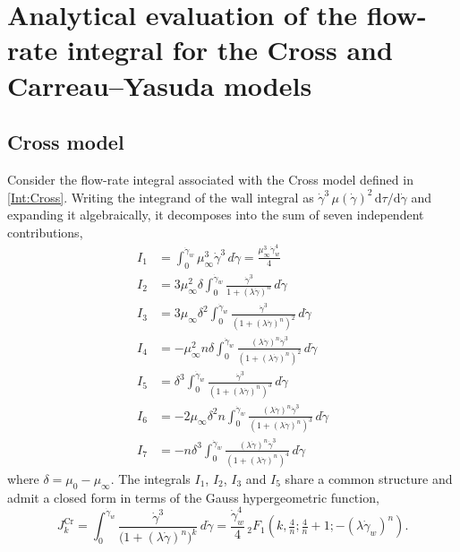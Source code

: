 \documentclass[lineno]{jfm}
\begin{document}





\appendix 
\section{Analytical evaluation of the flow-rate integral for the Cross and
Carreau--Yasuda models}\label{appA}

\subsection{Cross model}

Consider the flow-rate integral associated with the Cross model defined in
\eqref{Int:Cross}. Writing the integrand of the wall integral as
$\dot\gamma^{3}\,\mu(\dot\gamma)^{2}\,\mathrm d\tau/\mathrm d\dot\gamma$ and
expanding it algebraically, it decomposes into the sum of seven independent
contributions,
\begin{align}
I_1 &= \int_0^{\dot{\gamma}_w} \mu_{\infty}^3 \dot{\gamma}^3 \, d\dot{\gamma}
      = \frac{\mu_{\infty}^3 \dot{\gamma}_w^4}{4} \\[6pt]
I_2 &= 3\mu_{\infty}^2 \delta \int_0^{\dot{\gamma}_w}
      \frac{\dot{\gamma}^3}{1+(\lambda \dot{\gamma})^n} \, d\dot{\gamma} \\[6pt]
I_3 &= 3\mu_{\infty} \delta^2 \int_0^{\dot{\gamma}_w}
      \frac{\dot{\gamma}^3}{(1+(\lambda \dot{\gamma})^n)^2} \, d\dot{\gamma} \\[6pt]
I_4 &= -\mu_{\infty}^2 n \delta \int_0^{\dot{\gamma}_w}
      \frac{(\lambda \dot{\gamma})^{n}\dot{\gamma}^{3}}{(1+(\lambda \dot{\gamma})^n)^2}
      \, d\dot{\gamma} \\[6pt]
I_5 &= \delta^3 \int_0^{\dot{\gamma}_w}
      \frac{\dot{\gamma}^3}{(1+(\lambda \dot{\gamma})^n)^3} \, d\dot{\gamma} \\[6pt]
I_6 &= -2\mu_{\infty} \delta^2 n \int_0^{\dot{\gamma}_w}
      \frac{(\lambda \dot{\gamma})^{n}\dot{\gamma}^{3}}{(1+(\lambda \dot{\gamma})^n)^3}
      \, d\dot{\gamma} \\[6pt]
I_7 &= -n \delta^3 \int_0^{\dot{\gamma}_w}
      \frac{(\lambda \dot{\gamma})^{n}\dot{\gamma}^{3}}{(1+(\lambda \dot{\gamma})^n)^4}
      \, d\dot{\gamma}
\end{align}
where $\delta=\mu_0-\mu_\infty$. The integrals $I_1$, $I_2$, $I_3$ and $I_5$
share a common structure and admit a closed form in terms of the Gauss
hypergeometric function,
\begin{equation}
J_k^{\mathrm{Cr}} = \int_0^{\dot{\gamma}_w}
\frac{\dot{\gamma}^3}{\bigl(1+(\lambda \dot{\gamma})^n\bigr)^k} \, d\dot{\gamma}
= \frac{\dot{\gamma}_w^4}{4}\,
{}_2F_1\!\left(k, \tfrac{4}{n}; \tfrac{4}{n}+1; -(\lambda \dot{\gamma}_w)^n\right).
\end{equation}
\end{document}
